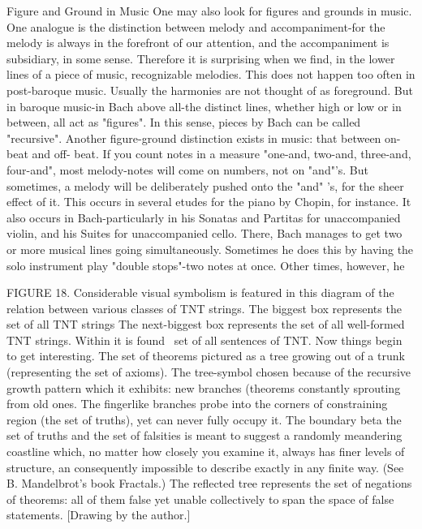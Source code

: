 Figure and Ground in Music One may also look for figures and grounds in music. One analogue is the distinction between melody and accompaniment-for the melody is always in the forefront of our attention, and the accompaniment is subsidiary, in some sense. Therefore it is surprising when we find, in the lower lines of a piece of music, recognizable melodies. This does not happen too often in post-baroque music. Usually the harmonies are not thought of as foreground. But in baroque music-in Bach above all-the distinct lines, whether high or low or in between, all act as "figures". In this sense, pieces by Bach can be called "recursive". Another figure-ground distinction exists in music: that between on-beat and off- beat. If you count notes in a measure "one-and, two-and, three-and, four-and", most melody-notes will come on numbers, not on "and"'s. But sometimes, a melody will be deliberately pushed onto the "and" 's, for the sheer effect of it. This occurs in several etudes for the piano by Chopin, for instance. It also occurs in Bach-particularly in his Sonatas and Partitas for unaccompanied violin, and his Suites for unaccompanied cello. There, Bach manages to get two or more musical lines going simultaneously. Sometimes he does this by having the solo instrument play "double stops"-two notes at once. Other times, however, he 







FIGURE 18. Considerable visual symbolism is featured in this diagram of the relation between various classes of TNT strings. The biggest box represents the set of all TNT strings The next-biggest box represents the set of all well-formed TNT strings. Within it is found~ set of all sentences of TNT. Now things begin to get interesting. The set of theorems pictured as a tree growing out of a trunk (representing the set of axioms). The tree-symbol chosen because of the recursive growth pattern which it exhibits: new branches (theorems constantly sprouting from old ones. The fingerlike branches probe into the corners of constraining region (the set of truths), yet can never fully occupy it. The boundary beta the set of truths and the set of falsities is meant to suggest a randomly meandering coastline which, no matter how closely you examine it, always has finer levels of structure, an consequently impossible to describe exactly in any finite way. (See B. Mandelbrot's book Fractals.) The reflected tree represents the set of negations of theorems: all of them false yet unable collectively to span the space of false statements. [Drawing by the author.] 

